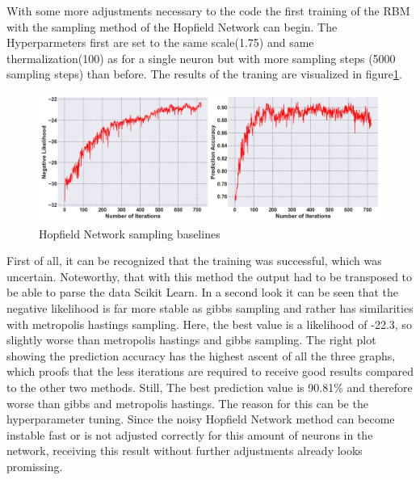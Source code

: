 With some more adjustments necessary to the code the first training of the \ac{RBM} with the sampling method of the Hopfield Network can begin. 
The Hyperparmeters first are set to the same scale(1.75) and same thermalization(100) as for a single neuron but with more sampling steps (5000 sampling steps) than before. 
The results of the traning are visualized in figure\ref{HNN_training}.
\begin{figure}[H]
    \centering
    \includegraphics[width=1\linewidth]{graphics/HNN_combined_plot.png}
    \caption{Hopfield Network sampling baselines}
    \label{HNN_training}
\end{figure}
First of all, it can be recognized that the training was successful, which was uncertain. 
Noteworthy, that with this method the output had to be transposed to be able to parse the data Scikit Learn.
In a second look it can be seen that the negative likelihood is far more stable as gibbs sampling and rather has similarities with metropolis hastings sampling.
Here, the best value is a likelihood of -22.3, so slightly worse than metropolis hastings and gibbs sampling. 
The right plot showing the prediction accuracy has the highest ascent of all the three graphs, which proofs that the 
less iterations are required to receive good results compared to the other two methods.
Still, The best prediction value is 90.81\% and therefore worse than gibbs and metropolis hastings. 
The reason for this can be the hyperparameter tuning.
Since the noisy Hopfield Network method can become instable fast or is not adjusted correctly 
for this amount of neurons in the network, receiving this result without further adjustments already looks promissing. 


